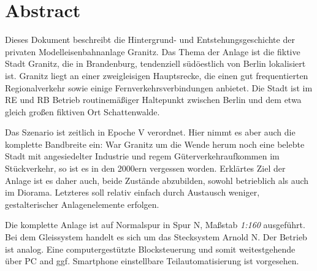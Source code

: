 \section{Abstract}
\label{sec:abstract}

Dieses Dokument beschreibt die Hintergrund- und Entstehungsgeschichte der privaten Modelleisenbahnanlage Granitz.
Das Thema der Anlage ist die fiktive Stadt Granitz, die in Brandenburg, tendenziell s\"ud\"oestlich von Berlin lokalisiert ist.
Granitz liegt an einer zweigleisigen Hauptsrecke, die einen gut frequentierten Regionalverkehr sowie einige Fernverkehrsverbindungen anbietet.
Die Stadt ist im RE und RB Betrieb routinem\"a{\ss}iger Haltepunkt zwischen Berlin und dem etwa gleich gro{\ss}en fiktiven Ort Schattenwalde.

Das Szenario ist zeitlich in Epoche V verordnet.
Hier nimmt es aber auch die komplette Bandbreite ein:
War Granitz um die Wende herum noch eine belebte Stadt mit angesiedelter Industrie und regem G\"uterverkehraufkommen im St\"uckverkehr, so ist es in den 2000ern vergessen worden.
Erkl\"artes Ziel der Anlage ist es daher auch, beide Zust\"ande abzubilden, sowohl betrieblich als auch im Diorama.
Letzteres soll relativ einfach durch Austausch weniger, gestalterischer Anlagenelemente erfolgen.

Die komplette Anlage ist auf Normalspur in Spur N, Ma{\ss}stab \textit{1:160} ausgef\"uhrt.
Bei dem Gleissystem handelt es sich um das Stecksystem Arnold N.
Der Betrieb ist analog.
Eine computergest\"utzte Blocksteuerung und somit weitestgehende \"uber PC and ggf. Smartphone einstellbare Teilautomatisierung ist vorgesehen.